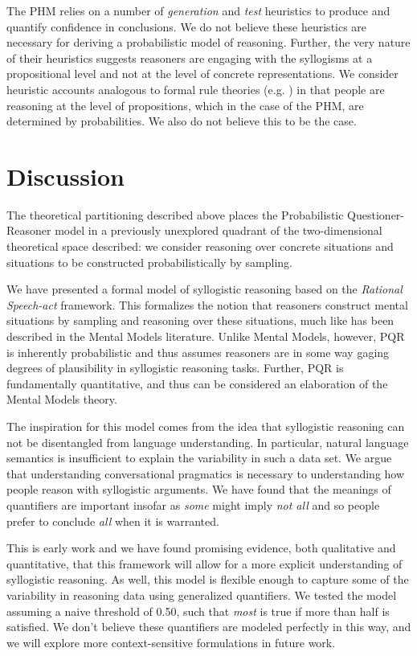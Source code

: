 \documentclass[10pt,letterpaper]{article}
\begin{document}
The PHM relies on a number of {\em generation} and {\em test} heuristics to produce and quantify confidence in conclusions. We do not believe these heuristics are necessary for deriving a probabilistic model of reasoning. Further, the very nature of their heuristics suggests reasoners are engaging with the syllogisms at a propositional level and not at the level of concrete representations. We consider heuristic accounts analogous to formal rule theories (e.g. ) in that people are reasoning at the level of propositions, which in the case of the PHM, are determined by probabilities. We also do not believe this to be the case.

\section{Discussion}

The theoretical partitioning described above places the Probabilistic Questioner-Reasoner model in a previously unexplored quadrant of the two-dimensional theoretical space described: we consider reasoning over concrete situations and situations to be constructed probabilistically by sampling.

We have presented a formal model of syllogistic reasoning based on the \emph{Rational Speech-act} framework. This formalizes the notion that reasoners construct mental situations by sampling and reasoning over these situations, much like has been described in the Mental Models literature. Unlike Mental Models, however, PQR is inherently probabilistic and thus assumes reasoners are in some way gaging degrees of plausibility in syllogistic reasoning tasks. Further, PQR is fundamentally quantitative, and thus can be considered an elaboration of the Mental Models theory.

The inspiration for this model comes from the idea that syllogistic reasoning can not be disentangled from language understanding. In particular, natural language semantics is insufficient to explain the variability in such a data set. We argue that understanding conversational pragmatics is necessary to understanding how people reason with syllogistic arguments. We have found that the meanings of quantifiers are important insofar as \emph{some} might imply \emph{not all} and so people prefer to conclude \emph{all} when it is warranted. 

This is early work and we have found promising evidence, both qualitative and quantitative, that this framework will allow for a more explicit understanding of syllogistic reasoning. As well, this model is flexible enough to capture some of the variability in reasoning data using generalized quantifiers. We tested the model assuming a naive threshold of 0.50, such that \emph{most} is true if more than half is satisfied. We don't believe these quantifiers are modeled perfectly in this way, and we will explore more context-sensitive formulations in future work.
\end{document}
